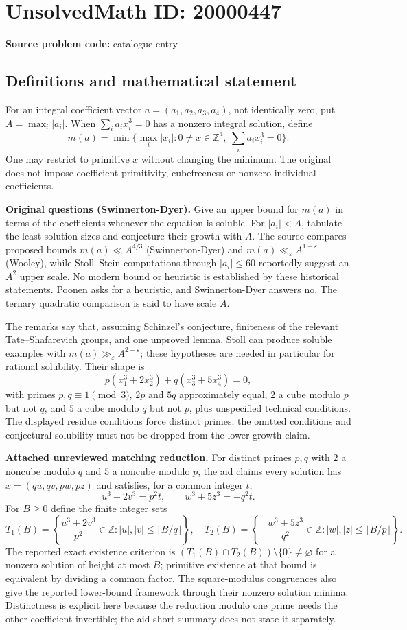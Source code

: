 \documentclass[11pt]{article}
\newcommand{\Z}{\mathbb{Z}}
\newcommand{\eps}{\varepsilon}
\begin{document}
\section*{UnsolvedMath ID: 20000447}
\textbf{Source problem code:} catalogue entry
\subsection{Definitions and mathematical statement}
For an integral coefficient vector $a=(a_1,a_2,a_3,a_4)$, not identically zero, put $A=\max_i|a_i|$. When $\sum_i a_ix_i^3=0$ has a nonzero integral solution, define
\[m(a)=\min\{\max_i|x_i|:0\ne x\in\Z^4,\ \sum_i a_ix_i^3=0\}.\]
One may restrict to primitive $x$ without changing the minimum. The original does not impose coefficient primitivity, cubefreeness or nonzero individual coefficients.

\textbf{Original questions (Swinnerton-Dyer).} Give an upper bound for $m(a)$ in terms of the coefficients whenever the equation is soluble. For $|a_i|<A$, tabulate the least solution sizes and conjecture their growth with $A$. The source compares proposed bounds $m(a)\ll A^{4/3}$ (Swinnerton-Dyer) and $m(a)\ll_\eps A^{1+\eps}$ (Wooley), while Stoll--Stein computations through $|a_i|\le60$ reportedly suggest an $A^2$ upper scale. No modern bound or heuristic is established by these historical statements. Poonen asks for a heuristic, and Swinnerton-Dyer answers no. The ternary quadratic comparison is said to have scale $A$.

The remarks say that, assuming Schinzel's conjecture, finiteness of the relevant Tate--Shafarevich groups, and one unproved lemma, Stoll can produce soluble examples with $m(a)\gg_\eps A^{2-\eps}$; these hypotheses are needed in particular for rational solubility. Their shape is
\[p(x_1^3+2x_2^3)+q(x_3^3+5x_4^3)=0,\]
with primes $p,q\equiv1\pmod3$, $2p$ and $5q$ approximately equal, $2$ a cube modulo $p$ but not $q$, and $5$ a cube modulo $q$ but not $p$, plus unspecified technical conditions. The displayed residue conditions force distinct primes; the omitted conditions and conjectural solubility must not be dropped from the lower-growth claim.

\textbf{Attached unreviewed matching reduction.} For distinct primes $p,q$ with $2$ a noncube modulo $q$ and $5$ a noncube modulo $p$, the aid claims every solution has $x=(qu,qv,pw,pz)$ and satisfies, for a common integer $t$,
\[u^3+2v^3=p^2t,\qquad w^3+5z^3=-q^2t.\]
For $B\ge0$ define the finite integer sets
\[T_1(B)=\left\{\frac{u^3+2v^3}{p^2}\in\Z:|u|,|v|\le\lfloor B/q\rfloor\right\},\quad T_2(B)=\left\{-\frac{w^3+5z^3}{q^2}\in\Z:|w|,|z|\le\lfloor B/p\rfloor\right\}.\]
The reported exact existence criterion is $(T_1(B)\cap T_2(B))\setminus\{0\}\ne\varnothing$ for a nonzero solution of height at most $B$; primitive existence at that bound is equivalent by dividing a common factor. The square-modulus congruences also give the reported lower-bound framework through their nonzero solution minima. Distinctness is explicit here because the reduction modulo one prime needs the other coefficient invertible; the aid short summary does not state it separately.
\end{document}
